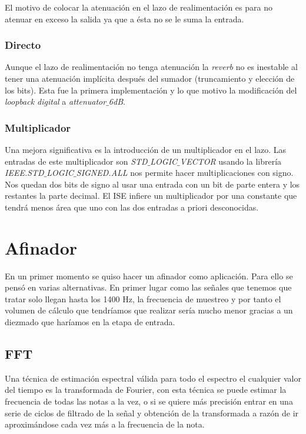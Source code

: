 		El motivo de colocar la atenuación en el lazo de realimentación es para no atenuar en exceso la salida ya que a ésta no se le suma la entrada. 

		\subsubsection{Directo} 
		Aunque el lazo de realimentación no tenga atenuación la \emph{reverb} no es inestable al tener una atenuación implícita después del sumador (truncamiento y elección de los bits). Esta fue la primera implementación y lo que motivo la modificación del \emph{loopback digital} a \emph{attenuator$\_$6dB}.
		
		\subsubsection{Multiplicador}
		Una mejora significativa es la introducción de un multiplicador en el lazo. Las entradas de este multiplicador son \emph{STD$\_$LOGIC$\_$VECTOR} usando la librería \emph{IEEE.STD$\_$LOGIC$\_$SIGNED.ALL} nos permite hacer multiplicaciones con signo. Nos quedan dos bits de signo al usar una entrada con un bit de parte entera y los restantes la parte decimal. El ISE infiere un multiplicador por una constante que tendrá menos área que uno con las dos entradas a priori desconocidas.



\section{Afinador}
	En un primer momento se quiso hacer un afinador como aplicación. Para ello se pensó en varias alternativas. En primer lugar como las señales que tenemos que tratar solo llegan hasta los 1400 Hz, la frecuencia de muestreo y por tanto el volumen de cálculo que tendríamos que realizar sería mucho menor gracias a un diezmado que haríamos en la etapa de entrada.
	
	\subsection{FFT}
	Una técnica de estimación espectral válida para todo el espectro el cualquier valor del tiempo es la transformada de Fourier, con esta técnica se puede estimar la frecuencia de todas las notas a la vez, o si se quiere más precisión entrar en una serie de ciclos de filtrado de la señal y obtención de la transformada a razón de ir aproximándose cada vez más a la frecuencia de la nota. \\
	
